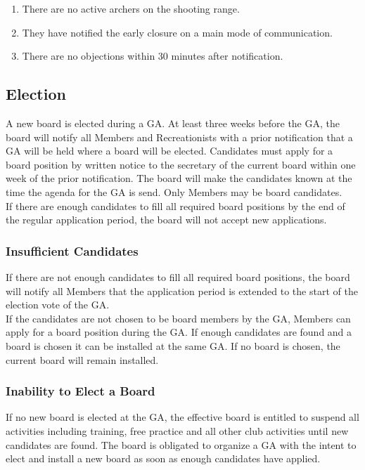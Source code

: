 \documentclass[a4paper]{article}
\begin{document}
\begin{enumerate}
\item There are no active archers on the shooting range.
\item They have notified the early closure on a main mode of communication.
\item There are no objections within 30 minutes after notification.
\end{enumerate}

\subsection{Election}
A new board is elected during a GA. At least three weeks before the GA, the board will notify all Members and Recreationists with a prior notification that a GA will be held where a board will be elected. Candidates must apply for a board position by written notice to the secretary of the current board within one week of the prior notification. The board will make the candidates known at the time the agenda for the GA is send. Only Members may be board candidates. \\

If there are enough candidates to fill all required board positions by the end of the regular application period, the board will not accept new applications. \\

\subsubsection{Insufficient Candidates}

If there are not enough candidates to fill all required board positions, the board will notify all Members that the application period is extended to the start of the election vote of the GA. \\

If the candidates are not chosen to be board members by the GA, Members can apply for a board position during the GA. If enough candidates are found and a board is chosen it can be installed at the same GA. If no board is chosen, the current board will remain installed.

\subsubsection{Inability to Elect a Board}

If no new board is elected at the GA, the effective board is entitled to suspend all activities including training, free practice and all other club activities until new candidates are found. The board is obligated to organize a GA with the intent to elect and install a new board as soon as enough candidates have applied. \\
\end{document}

